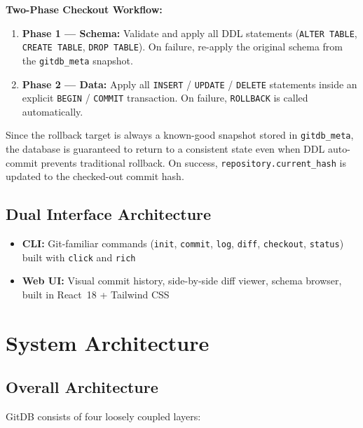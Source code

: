 \documentclass[12pt, a4paper]{article}
\begin{document}
\begin{tcolorbox}[infobox]
\textbf{Two-Phase Checkout Workflow:}
\begin{enumerate}[leftmargin=1.5em, itemsep=0.2em]
    \item \textbf{Phase 1 --- Schema:} Validate and apply all DDL statements
    (\texttt{ALTER TABLE}, \texttt{CREATE TABLE}, \texttt{DROP TABLE}). On
    failure, re-apply the original schema from the \texttt{gitdb\_meta} snapshot.
    \item \textbf{Phase 2 --- Data:} Apply all \texttt{INSERT} /
    \texttt{UPDATE} / \texttt{DELETE} statements inside an explicit
    \texttt{BEGIN} / \texttt{COMMIT} transaction. On failure, \texttt{ROLLBACK}
    is called automatically.
\end{enumerate}
Since the rollback target is always a known-good snapshot stored in
\texttt{gitdb\_meta}, the database is guaranteed to return to a consistent state
even when DDL auto-commit prevents traditional rollback. On success,
\texttt{repository.current\_hash} is updated to the checked-out commit hash.
\end{tcolorbox}

\subsection{Dual Interface Architecture}

\begin{itemize}[leftmargin=1.5em, itemsep=0.3em]
    \item \textbf{CLI:} Git-familiar commands (\texttt{init}, \texttt{commit},
    \texttt{log}, \texttt{diff}, \texttt{checkout}, \texttt{status}) built with
    \texttt{click} and \texttt{rich}
    \item \textbf{Web UI:} Visual commit history, side-by-side diff viewer,
    schema browser, built in React~18 + Tailwind CSS
\end{itemize}

\section{System Architecture}

\subsection{Overall Architecture}

GitDB consists of four loosely coupled layers:
\end{document}
